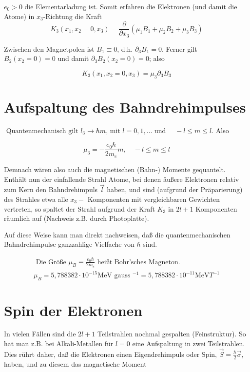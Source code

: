 \documentclass[10pt, letterpaper]{article}
\begin{document}
$e_{0}>0$ die Elementarladung ist. Somit erfahren die Elektronen (und damit die Atome) in $x_{3}$-Richtung die Kraft
$$
K_{3}\left(x_{1}, x_{2}=0, x_{3}\right)=\frac{\partial}{\partial x_{3}}\left(\mu_{1} B_{1}+\mu_{2} B_{2}+\mu_{3} B_{3}\right)
$$

Zwischen den Magnetpolen ist $B_{1} \equiv 0$, d.h. $\partial_{3} B_{1}=0$. Ferner gilt $B_{2}\left(x_{2}=0\right)=0$ und damit $\partial_{3} B_{2}\left(x_{2}=0\right)=0$; also

$$
K_{3}\left(x_{1}, x_{2}=0, x_{3}\right)=\mu_{3} \partial_{3} B_{3}
$$

\section*{Aufspaltung des Bahndrehimpulses}
$\overline{\text { Quantenmechanisch gilt } l_{3} \rightarrow \hbar m \text {, mit } l}=0,1, \ldots$ und $\quad-l \leq m \leq l$. Also

$$
\mu_{3}=-\frac{e_{0} \hbar}{2 m_{e}} m, \quad-l \leq m \leq l
$$

Demnach wären also auch die magnetischen (Bahn-) Momente gequantelt. Enthält nun der einfallende Strahl Atome, bei denen äußere Elektronen relativ zum Kern den Bahndrehimpuls $\vec{l}$ haben, und sind (aufgrund der Präparierung) des Strahles etwa alle $x_{3}-$ Komponenten mit vergleichbaren Gewichten vertreten, so spaltet der Strahl aufgrund der Kraft $K_{3}$ in $2 l+1$ Komponenten räumlich auf (Nachweis z.B. durch Photoplatte).

Auf diese Weise kann man direkt nachweisen, daß die quantenmechanischen Bahndrehimpulse ganzzahlige Vielfache von $\hbar$ sind.

$$
\begin{array}{c|}
\hline \text { Die Größe } \mu_{B} \equiv \frac{e_{0} \hbar}{2 m_{e}} \text { heißt Bohr'sches Magneton. } \\
\mu_{B}=5,788382 \cdot 10^{-15} \mathrm{MeV} \text { gauss }^{-1}=5,788382 \cdot 10^{-11} \mathrm{MeV} T^{-1}
\end{array}
$$

\section*{Spin der Elektronen}
In vielen Fällen sind die $2 l+1$ Teilstrahlen nochmal gespalten (Feinstruktur). So hat man z.B. bei Alkali-Metallen für $l=0$ eine Aufspaltung in zwei Teilstrahlen. Dies rührt daher, daß die Elektronen einen Eigendrehimpuls oder Spin, $\vec{S}=\frac{\hbar}{2} \vec{\sigma}$, haben, und zu diesem das magnetische Moment
\end{document}
